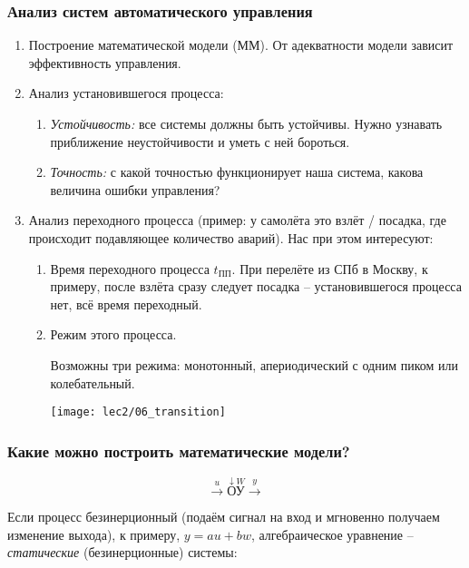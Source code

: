 \documentclass[main.tex]{subfiles}
\begin{document}
\subsubsection{Анализ систем автоматического управления}

\begin{enumerate}[noitemsep]
	\item Построение математической модели (ММ). От адекватности модели зависит эффективность управления.
	\item Анализ установившегося процесса:
	\begin{enumerate}[noitemsep]
		\item \emph{Устойчивость:} все системы должны быть устойчивы.
		Нужно узнавать приближение неустойчивости и уметь с ней бороться.
		\item \emph{Точность:} с какой точностью функционирует наша система, какова величина ошибки управления?
	\end{enumerate}
	\item Анализ переходного процесса (пример: у самолёта это взлёт / посадка, где происходит подавляющее количество аварий).
	Нас при этом интересуют:
	\begin{enumerate}[noitemsep]
		\item Время переходного процесса $ t_{\text{ПП}} $. При перелёте из СПб в Москву, к примеру, после взлёта сразу следует посадка -- установившегося процесса нет, всё время переходный.

		\item Режим этого процесса.

        Возможны три режима: монотонный, апериодический с одним пиком или колебательный.

        \texttt{[image: lec2/06\_transition]}
	\end{enumerate}
\end{enumerate}

\subsubsection{ Какие можно построить математические модели? }

\[ \xrightarrow{u} \overset{\downarrow
    W}{\boxed{\text{ОУ}}}\xrightarrow{y} \]

Если процесс безинерционный (подаём сигнал на вход и мгновенно получаем изменение выхода), к примеру, $ y = au + bw $, алгебраическое уравнение -- \emph{статические} (безинерционные) системы:
\end{document}
